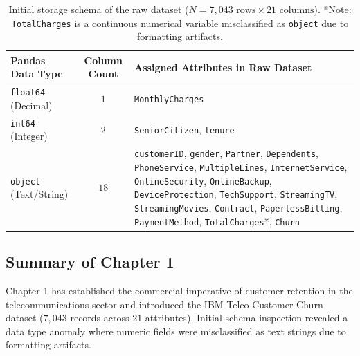\begin{table}[htbp]
\centering
\small
\begin{tabularx}{\textwidth}{l c X}
\toprule
\textbf{Pandas Data Type} & \textbf{Column Count} & \textbf{Assigned Attributes in Raw Dataset} \\
\midrule
\texttt{float64} (Decimal) & $1$ & \texttt{MonthlyCharges} \\
\addlinespace
\texttt{int64} (Integer) & $2$ & \texttt{SeniorCitizen}, \texttt{tenure} \\
\addlinespace
\texttt{object} (Text/String) & $18$ & \texttt{customerID}, \texttt{gender}, \texttt{Partner}, \texttt{Dependents}, \texttt{PhoneService}, \texttt{MultipleLines}, \texttt{InternetService}, \texttt{OnlineSecurity}, \texttt{OnlineBackup}, \texttt{DeviceProtection}, \texttt{TechSupport}, \texttt{StreamingTV}, \texttt{StreamingMovies}, \texttt{Contract}, \texttt{PaperlessBilling}, \texttt{PaymentMethod}, \texttt{TotalCharges}*, \texttt{Churn} \\
\bottomrule
\end{tabularx}
\caption{Initial storage schema of the raw dataset ($N = 7,043\text{ rows} \times 21\text{ columns}$). *Note: \texttt{TotalCharges} is a continuous numerical variable misclassified as \texttt{object} due to formatting artifacts.}
\label{tab:raw_schema}
\end{table}

\subsection{Summary of Chapter 1}
Chapter 1 has established the commercial imperative of customer retention in the telecommunications sector and introduced the IBM Telco Customer Churn dataset ($7,043$ records across $21$ attributes). Initial schema inspection revealed a data type anomaly where numeric fields were misclassified as text strings due to formatting artifacts. 